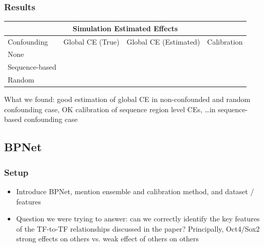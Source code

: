 \documentclass[twoside,11pt]{article}
\begin{document}
\subsubsection{Results}%
\label{ssub:sim_results}
\begin{tabular}{ |p{3cm}||p{5cm}|p{5cm}|p{3cm}|  }
 \hline
 \multicolumn{4}{|c|}{Simulation Estimated Effects} \\
 \hline
 Confounding & Global CE (True) & Global CE (Estimated) & Calibration \\
 \hline
 None   &     & &   \\
 \hline
 Sequence-based & &  & \\
 \hline
 Random & & & \\
 \hline
\end{tabular}

What we found: good estimation of global CE in non-confounded and random confounding case, OK calibration of sequence region level CEs, \dots in sequence-based confounding case

\subsection{BPNet}%
\label{sub:between_tf_relationships}

\subsubsection{Setup}%
\label{ssub:btwn_tf_setup}

\begin{itemize}
	\item Introduce BPNet, mention ensemble and calibration method, and dataset / features
	\item Question we were trying to answer: can we correctly identify the key features of the TF-to-TF relationships discussed in the paper? Principally, Oct4/Sox2 strong effects on others vs. weak effect of others on others
\end{itemize}
\end{document}
